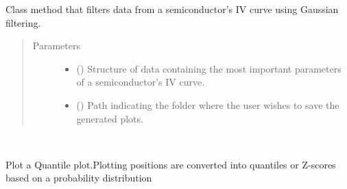 \documentclass[letterpaper,10pt,english,openany, oneside]{sphinxmanual}
\begin{document}
\begin{fulllineitems}
\begin{fulllineitems}
\begin{fulllineitems}
Class method that filters data from a semiconductor’s IV curve using Gaussian filtering.

\end{fulllineitems}

\begin{quote}\begin{description}
\item[{Parameters}] \leavevmode\begin{itemize}
\item {} 
 () \textendash{} Structure of data containing the most important parameters of a semiconductor’s IV curve.

\item {} 
 (\sphinxstyleliteralemphasis{\sphinxupquote{, }}) \textendash{} Path indicating the folder where the user wishes to save the generated plots.

\end{itemize}

\end{description}\end{quote}

\end{fulllineitems}


\begin{fulllineitems}
\label{\detokenize{index:fompy.plots.plotter.qq}}~

\begin{fulllineitems}
Plot a Quantile plot.Plotting positions are converted into quantiles
or Z-scores based on a probability distribution

\end{fulllineitems}


\end{fulllineitems}
\end{fulllineitems}
\end{document}
